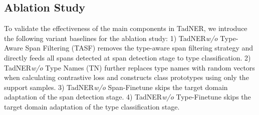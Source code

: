 \documentclass[11pt]{article}
\newcommand{\ours}{{TadNER}\xspace}
\begin{document}
\subsection{Ablation Study}
To validate the effectiveness of the main components in \ours, we introduce the following variant baselines for the ablation study:
1) \ours \textit{w/o} Type-Aware Span Filtering (TASF) removes the type-aware span filtering strategy and directly feeds all spans detected at {span detection} stage to {type classification}.
2) \ours \textit{w/o} Type Names (TN) further replaces type names with random vectors when calculating contrastive loss and constructs class prototypes using only the support samples.
3) \ours \textit{w/o} Span-Finetune skips the target domain adaptation of the span detection stage.
4) \ours \textit{w/o} Type-Finetune skips the target domain adaptation of the type classification stage.
\end{document}
